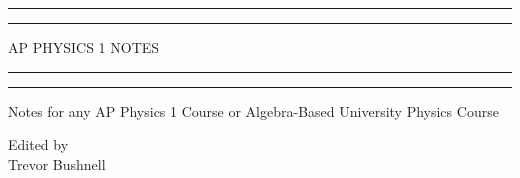 \documentclass{package/notes}
\begin{document}
	\begin{titlepage} %
		
		\centering %
		
		\scshape %
		
		\vspace*{\baselineskip} %
		
		
		\rule{\textwidth}{1.6pt}\vspace*{-\baselineskip}\vspace*{2pt} %
		\rule{\textwidth}{0.4pt} %
		
		\vspace{0.75\baselineskip} %
		
		{\huge AP PHYSICS 1 NOTES\\} %
		
		\vspace{0.75\baselineskip} %
		
		\rule{\textwidth}{0.4pt}\vspace*{-\baselineskip}\vspace{3.2pt} %
		\rule{\textwidth}{1.6pt} %
		
		\vspace{2\baselineskip} %
		
		
		\LARGE{Notes for any AP Physics 1 Course or Algebra-Based University Physics Course} 
		
		\vspace*{3\baselineskip} %
		
		
		
		\vspace{0.5\baselineskip} 
		
		
		
		\vspace{0.5\baselineskip} 
		
		
		
		\vfill 
		
		
		
		\vspace{0.3\baselineskip} 
		
		
		{\large Edited by\\  Trevor Bushnell} 
		
	\end{titlepage}
	\tableofcontents
\end{document}
